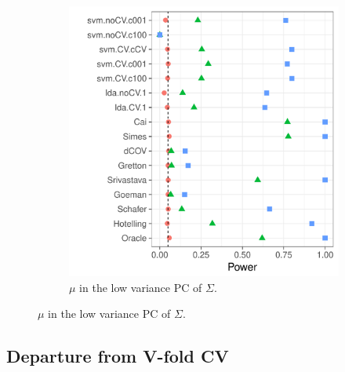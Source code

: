 \documentclass[onecolumn,draftclsnofoot]{IEEEtran}
\begin{document}
\begin{figure}[h]
\begin{subfigure}[t]{0.45\columnwidth}
		\includegraphics[width=1\columnwidth]{"art/file24"}
		\caption{$\mu$ in the low variance PC of $\Sigma$.}  
		\label{fig:heteroskedastic_12}	
	\end{subfigure}
\end{figure}







\subsection{Departure from V-fold CV}
\label{sec:bootstrap}
\end{document}
